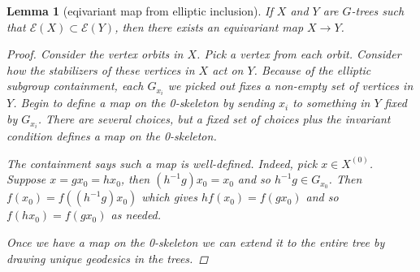 \documentclass{article}
\theoremstyle{mystyle}
\newtheorem{lem}{Lemma}[section]
\theoremstyle{remark}
\begin{document}
\begin{lem}[eqivariant map from elliptic inclusion]
    If $X$ and $Y$ are \(G\)-trees such that $\mathcal{E}(X)\subset\mathcal{E}(Y)$, then there exists an equivariant map $X\to Y$.
 
 \begin{proof}
 Consider the vertex orbits in $X$. Pick a vertex from each orbit. Consider how the stabilizers of these vertices in $X$ act on $Y$. Because of the elliptic subgroup containment, each $G_{x_i}$ we picked out fixes a non-empty set of vertices in $Y$. Begin to define a map on the 0-skeleton by sending $x_i$ to something in $Y$ fixed by $G_{x_i}$. There are several choices, but a fixed set of choices plus the invariant condition defines a map on the 0-skeleton.
 
The containment says such a map is well-defined. Indeed, pick $x \in X^{(0)}$. Suppose $x=gx_0=hx_0$, then $(h^{-1}g)x_0 = x_0$ and so $h^{-1}g \in G_{x_0}$. Then $f(x_0)=f( (h^{-1}g)x_0)$ which gives $h f(x_0) = f(gx_0)$ and so $f(hx_0)=f(gx_0)$ as needed.
 
 Once we have a map on the 0-skeleton we can extend it to the entire tree by drawing unique geodesics in the trees.
\end{proof}
\end{lem}

\end{document}

